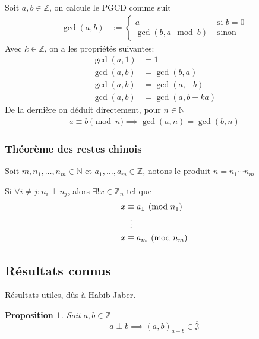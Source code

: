 \documentclass{article}
\newtheorem{proposition}{Proposition}
\newcommand{\J}{\mathfrak{J}}
\newcommand{\JS}{\overline{\J}}
\begin{document}
Soit $a, b \in \mathbb{Z}$, on calcule le PGCD comme suit
\begin{align*}
    \gcd(a, b) & := \begin{cases}
        a & \text{ si $b = 0$} \\
        \gcd(b, a \mod b) & \text{ sinon}
    \end{cases}
\end{align*}
Avec $k \in \mathbb{Z}$, on a les propriétés suivantes:
\begin{align*}
    \gcd(a, 1) & = 1 \\
    \gcd(a, b) & = \gcd(b, a) \\
    \gcd(a, b) &= \gcd(a, -b) \\
    \gcd(a, b) & = \gcd(a, b + ka)
\end{align*}
De la dernière on déduit directement, pour $n \in \mathbb{N}$
\begin{align*}
        a \equiv b \pmod n \implies \gcd(a, n) = \gcd(b, n)
\end{align*}

\subsubsection{Théorème des restes chinois}

Soit $m, n_1, \dots, n_m \in \mathbb{N}$ et $a_1, \dots, a_m \in \mathbb{Z}$, notons le produit $n = n_1 \cdots n_m$

Si $\forall i \neq j : n_i \perp n_j$, alors $\exists!x \in \mathbb{Z}_n$ tel que
\begin{align*}
    x &\equiv a_1 \pmod {n_1} \\
    &\vdotswithin{\equiv} \\
    x &\equiv a_m \pmod {n_m}
\end{align*}

\newpage

\subsection{Résultats connus}
Résultats utiles, dûs à Habib Jaber.

\begin{proposition}
    Soit $a, b \in \mathbb{Z}$
    \[ a \perp b \implies {(a, b)}_{a + b} \in \JS \]
\end{proposition}
\end{document}
